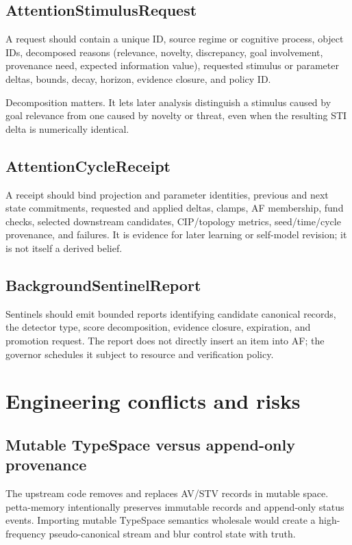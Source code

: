 \documentclass[11pt]{article}
\begin{document}
\subsection{AttentionStimulusRequest}

A request should contain a unique ID, source regime or cognitive process,
object IDs, decomposed reasons (relevance, novelty, discrepancy, goal
involvement, provenance need, expected information value), requested stimulus
or parameter deltas, bounds, decay, horizon, evidence closure, and policy ID.

Decomposition matters.  It lets later analysis distinguish a stimulus caused
by goal relevance from one caused by novelty or threat, even when the resulting
STI delta is numerically identical.

\subsection{AttentionCycleReceipt}

A receipt should bind projection and parameter identities, previous and next
state commitments, requested and applied deltas, clamps, AF membership, fund
checks, selected downstream candidates, CIP/topology metrics, seed/time/cycle
provenance, and failures.  It is evidence for later learning or self-model
revision; it is not itself a derived belief.

\subsection{BackgroundSentinelReport}

Sentinels should emit bounded reports identifying candidate canonical records,
the detector type, score decomposition, evidence closure, expiration, and
promotion request.  The report does not directly insert an item into AF; the
governor schedules it subject to resource and verification policy.

\section{Engineering conflicts and risks}

\subsection{Mutable TypeSpace versus append-only provenance}

The upstream code removes and replaces AV/STV records in mutable space.
petta-memory intentionally preserves immutable records and append-only status
events.  Importing mutable TypeSpace semantics wholesale would create a
high-frequency pseudo-canonical stream and blur control state with truth.
\end{document}
